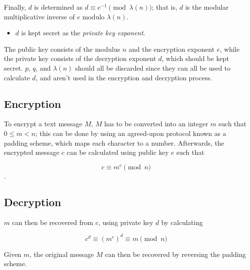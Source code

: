 Finally, $d$ is determined as $d \equiv e^{-1}\pmod{\lambda(n)}$; that is, $d$ is the modular multiplicative inverse of $e$ modulo $\lambda(n)$.

\begin{itemize}
  \item $d$ is kept secret as the \textit{private key exponent}.
\end{itemize}

The public key consists of the modulus $n$ and the encryption exponent $e$, while the private key consists of the decryption exponent $d$, which should be kept secret. $p$, $q$, and $\lambda(n)$ should all be discarded since they can all be used to calculate $d$, and aren't used in the encryption and decryption process.


\subsection{Encryption}\label{sec:section3.2}

To encrypt a text message $M$, $M$ has to be converted into an integer $m$ such that $0 \leq m < n $; this can be done by using an agreed-upon protocol known as a padding scheme, which maps each character to a number. Afterwards, the encrypted message $c$ can be calculated using public key $e$ such that 

$$c \equiv m^e \pmod{n}$$.



\subsection{Decryption}\label{sec:section3.3}

$m$ can then be recovered from $c$, using private key $d$ by calculating

$$c^d \equiv (m^e)^d \equiv m \pmod{n}$$

Given $m$, the original message $M$ can then be recovered by reversing the padding scheme.
